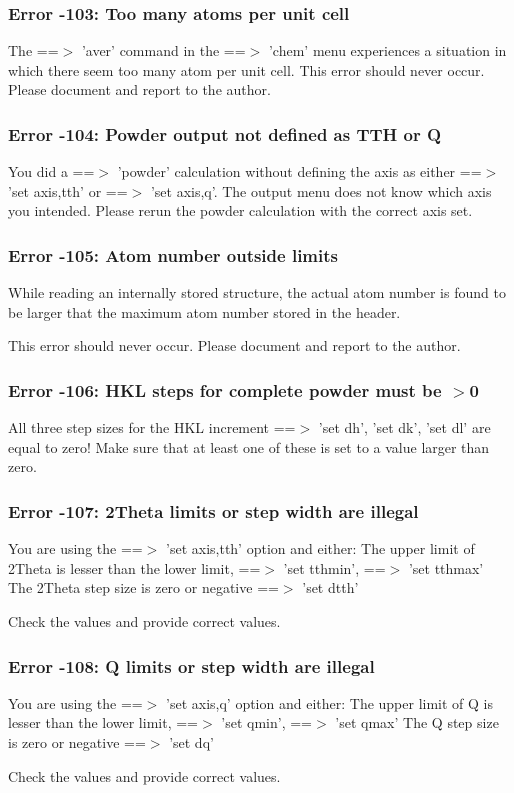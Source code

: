\subsubsection{Error -103: Too many atoms per unit cell}
\par
The ==$> $ 'aver' command in the ==$> $ 'chem' menu experiences a situation 
in which there seem too many atom per unit cell. 
This error should never occur. 
Please document and report to the author. 
\subsubsection{Error -104: Powder output not defined as TTH or Q}
\par
You did a ==$> $ 'powder' calculation without defining the axis as either 
==$> $ 'set axis,tth' or ==$> $ 'set axis,q'. The output menu does not know 
which axis you intended. Please rerun the powder calculation with the 
correct axis set. 
\subsubsection{Error -105: Atom number outside limits}
\par
While reading an internally stored structure, the actual atom number is 
found to be larger that the maximum atom number stored in the header. 
\par
This error should never occur. 
Please document and report to the author. 
\subsubsection{Error -106: HKL steps for complete powder must be $> $0}
\par
All three step sizes for the HKL increment ==$> $ 'set dh', 'set dk', 
'set dl' are equal to zero! 
Make sure that at least one of these is set to a value larger than zero. 
\subsubsection{Error -107: 2Theta limits or step width are illegal}
\par
You are using the ==$> $ 'set axis,tth' option and either: 
The upper limit of 2Theta is lesser than the lower limit, 
   ==$> $ 'set tthmin',    ==$> $ 'set tthmax' 
The 2Theta step size is zero or negative 
   ==$> $ 'set dtth' 
\par
Check the values and provide correct values. 
\subsubsection{Error -108: Q limits or step width are illegal}
\par
You are using the ==$> $ 'set axis,q' option and either: 
The upper limit of Q is lesser than the lower limit, 
   ==$> $ 'set   qmin',    ==$> $ 'set   qmax' 
The Q step size is zero or negative 
   ==$> $ 'set dq' 
\par
Check the values and provide correct values. 
